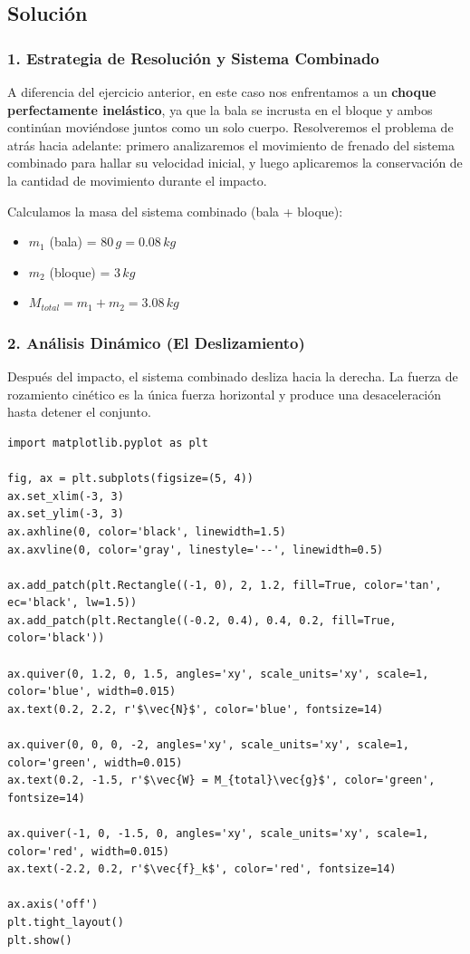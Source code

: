 \documentclass[12pt, a4paper]{article}
\begin{document}
\subsection*{Solución}

\subsubsection*{1. Estrategia de Resolución y Sistema Combinado}
A diferencia del ejercicio anterior, en este caso nos enfrentamos a un \textbf{choque perfectamente inelástico}, ya que la bala se incrusta en el bloque y ambos continúan moviéndose juntos como un solo cuerpo.
Resolveremos el problema de atrás hacia adelante: primero analizaremos el movimiento de frenado del sistema combinado para hallar su velocidad inicial, y luego aplicaremos la conservación de la cantidad de movimiento durante el impacto.

Calculamos la masa del sistema combinado (bala + bloque):
\begin{itemize}
    \item $m_1$ (bala) = $80 \, \si{g} = 0.08 \, \si{kg}$
    \item $m_2$ (bloque) = $3 \, \si{kg}$
    \item $M_{total} = m_1 + m_2 = 3.08 \, \si{kg}$
\end{itemize}

\subsubsection*{2. Análisis Dinámico (El Deslizamiento)}
Después del impacto, el sistema combinado desliza hacia la derecha. La fuerza de rozamiento cinético es la única fuerza horizontal y produce una desaceleración hasta detener el conjunto.

\begin{lstlisting}
import matplotlib.pyplot as plt

fig, ax = plt.subplots(figsize=(5, 4))
ax.set_xlim(-3, 3)
ax.set_ylim(-3, 3)
ax.axhline(0, color='black', linewidth=1.5)
ax.axvline(0, color='gray', linestyle='--', linewidth=0.5)

ax.add_patch(plt.Rectangle((-1, 0), 2, 1.2, fill=True, color='tan', ec='black', lw=1.5))
ax.add_patch(plt.Rectangle((-0.2, 0.4), 0.4, 0.2, fill=True, color='black'))

ax.quiver(0, 1.2, 0, 1.5, angles='xy', scale_units='xy', scale=1, color='blue', width=0.015)
ax.text(0.2, 2.2, r'$\vec{N}$', color='blue', fontsize=14)

ax.quiver(0, 0, 0, -2, angles='xy', scale_units='xy', scale=1, color='green', width=0.015)
ax.text(0.2, -1.5, r'$\vec{W} = M_{total}\vec{g}$', color='green', fontsize=14)

ax.quiver(-1, 0, -1.5, 0, angles='xy', scale_units='xy', scale=1, color='red', width=0.015)
ax.text(-2.2, 0.2, r'$\vec{f}_k$', color='red', fontsize=14)

ax.axis('off')
plt.tight_layout()
plt.show()
\end{lstlisting}
\end{document}
